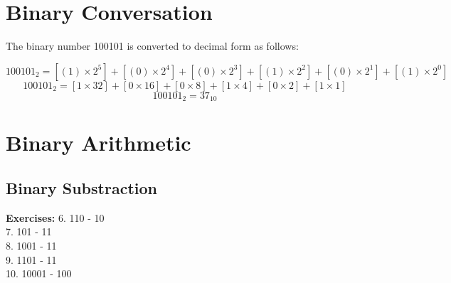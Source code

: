 \documentclass[12pt]{article}
\begin{document}
\section{Binary Conversation}
The binary number 100101 is converted to decimal form as follows:

\[
100101_2 = [ ( 1 ) \times 2^5 ] + [ ( 0 ) \times 2^4 ] + [ ( 0 ) \times 2^3 ] + [ ( 1 ) \times 2^2 ] + [ ( 0 ) \times 2^1 ] + [ ( 1 ) \times 2^0 ]  
\]
\[
100101_2 = [ 1 \times 32 ] + [ 0 \times 16 ] + [ 0 \times 8 ] + [ 1 \times 4 ] + [ 0 \times 2 ] + [ 1 \times 1 ] 
\]
\[
100101_2 = 37_{10}
\]


\newpage
\section{Binary Arithmetic}



\subsection{Binary Substraction}
\textbf{Exercises:}
6. 110 - 10 \\
7. 101 - 11 \\
8. 1001 - 11 \\
9. 1101 - 11 \\
10. 10001 - 100 \\
\newpage
\end{document}
